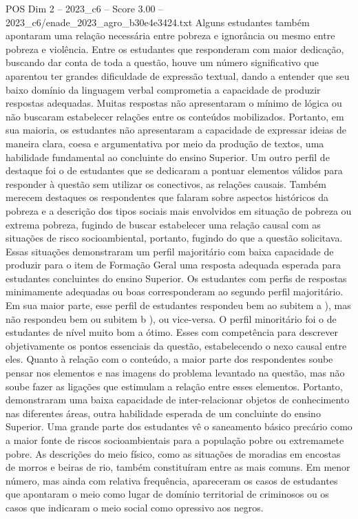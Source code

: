 \begin{textsample}{POS Dim 2 – 2023\_c6 – Score 3.00 – 2023\_c6/enade\_2023\_agro\_b30e4e3424.txt}
Alguns estudantes também apontaram uma relação necessária entre pobreza e ignorância ou mesmo entre pobreza e violência.
Entre os estudantes que responderam com maior dedicação, buscando dar conta de toda a questão, houve um número significativo que aparentou ter grandes dificuldade de expressão textual, dando a entender que seu baixo domínio da linguagem verbal comprometia a capacidade de produzir respostas adequadas.
Muitas respostas não apresentaram o mínimo de lógica ou não buscaram estabelecer relações entre os conteúdos mobilizados.
Portanto, em sua maioria, os estudantes não apresentaram a capacidade de expressar ideias de maneira clara, coesa e argumentativa por meio da produção de textos, uma habilidade fundamental ao concluinte do ensino Superior.
Um outro perfil de destaque foi o de estudantes que se dedicaram a pontuar elementos válidos para responder à questão sem utilizar os conectivos, as relações causais.
Também merecem destaques os respondentes que falaram sobre aspectos históricos da pobreza e a descrição dos tipos sociais mais envolvidos em situação de pobreza ou extrema pobreza, fugindo de buscar estabelecer uma relação causal com as situações de risco socioambiental, portanto, fugindo do que a questão solicitava.
Essas situações demonstraram um perfil majoritário com baixa capacidade de produzir para o item de Formação Geral uma resposta adequada esperada para estudantes concluintes do ensino Superior.
Os estudantes com perfis de respostas minimamente adequadas ou boas corresponderam ao segundo perfil majoritário.
Em sua maior parte, esse perfil de estudantes respondeu bem ao subitem a ), mas não respondeu bem ou subitem b ), ou vice-versa.
O perfil minoritário foi o de estudantes de nível muito bom a ótimo.
Esses com competência para descrever objetivamente os pontos essenciais da questão, estabelecendo o nexo causal entre eles.
Quanto à relação com o conteúdo, a maior parte dos respondentes soube pensar nos elementos e nas imagens do problema levantado na questão, mas não soube fazer as ligações que estimulam a relação entre esses elementos.
Portanto, demonstraram uma baixa capacidade de inter-relacionar objetos de conhecimento nas diferentes áreas, outra habilidade esperada de um concluinte do ensino Superior.
Uma grande parte dos estudantes vê o saneamento básico precário como a maior fonte de riscos socioambientais para a população pobre ou extremamete pobre.
As descrições do meio físico, como as situações de moradias em encostas de morros e beiras de rio, também constituíram entre as mais comuns.
Em menor número, mas ainda com relativa frequência, apareceram os casos de estudantes que apontaram o meio como lugar de domínio territorial de criminosos ou os casos que indicaram o meio social como opressivo aos negros.

\end{textsample}
